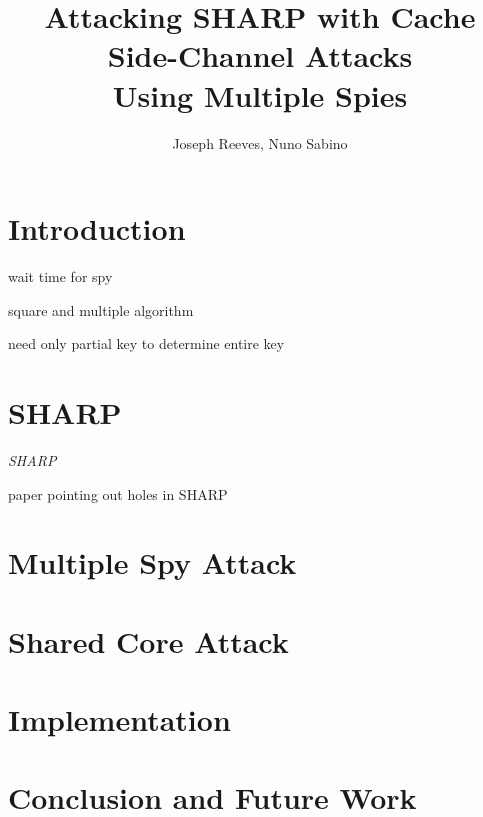 \documentclass[12pt]{article}
\title{Attacking SHARP with Cache Side-Channel Attacks\\Using Multiple Spies}
\author{Joseph Reeves, Nuno Sabino}
\begin{document}
\maketitle


\section{Introduction}

wait time for spy~\cite{waitTime}

square and multiple algorithm~\cite{exp}

need only partial key to determine entire key~\cite{partKey}

\section{SHARP}

{\it SHARP}~\cite{sharp}

paper pointing out holes in SHARP~\cite{howSharp}

\section{Multiple Spy Attack}

\section{Shared Core Attack}

\section{Implementation}

\section{Conclusion and Future Work}
\end{document}
